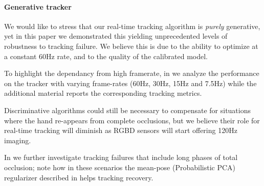 \paragraph{Generative tracker}
We would like to stress that our real-time tracking algorithm is \emph{purely} generative, yet in this paper we demonstrated this yielding unprecedented levels of robustness to tracking failure. We believe this is due to the ability to optimize at a constant 60Hz rate, and to the quality of the calibrated model.
\begin{draft}
To highlight the dependancy from high framerate, in \VideoLimFramerate{} we analyze the performance on the tracker with varying frame-rates (60Hz, 30Hz, 15Hz and 7.5Hz) while the additional material reports the corresponding tracking metrics.
\end{draft}
% 
Discriminative algorithms could still be necessary to compensate for situations where the hand re-appears from complete occlusions, but we believe their role for real-time tracking will diminish as RGBD sensors will start offering 120Hz imaging.  
% 
\begin{draft}
In \VideoLimOcclusions{} we further investigate tracking failures that include long phases of total occlusion; note how in these scenarios the mean-pose (Probabilistic PCA) regularizer described in \cite[Eq.6]{tagliasacchi2015robust} helps tracking recovery.
\end{draft}


